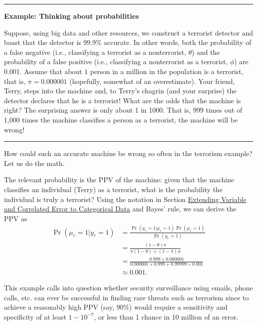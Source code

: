 \documentclass[]{krantz}
\begin{document}
\begin{center}\rule{0.5\linewidth}{\linethickness}\end{center}

\textbf{Example: Thinking about probabilities}

Suppose, using big data and other resources, we construct a terrorist
detector and boast that the detector is 99.9\% accurate. In other words,
both the probability of a false negative (i.e., classifying a terrorist
as a nonterrorist, \(\theta\)) and the probability of a false positive
(i.e., classifying a nonterrorist as a terrorist, \(\phi\)) are 0.001.
Assume that about \(1\) person in a million in the population is a
terrorist, that is, \(\pi = 0.000001\) (hopefully, somewhat of an
overestimate). Your friend, Terry, steps into the machine and, to
Terry's chagrin (and your surprise) the detector declares that he is a
terrorist! What are the odds that the machine is right? The surprising
answer is only about 1 in 1000. That is, 999 times out of 1,000 times
the machine classifies a person as a terrorist, the machine will be
wrong!

\begin{center}\rule{0.5\linewidth}{\linethickness}\end{center}

How could such an accurate machine be wrong so often in the terrorism
example? Let us do the math.

The relevant probability is the PPV of the machine: given that the
machine classifies an individual (Terry) as a terrorist, what is the
probability the individual is truly a terrorist? Using the notation in
Section \protect\hyperlink{sec:10-4.2.2}{Extending Variable and
Correlated Error to Categorical Data} and Bayes' rule, we can derive the
PPV as \[\begin{aligned}
\Pr (\mu_r = 1\vert y_r = 1) &=  \frac{\Pr (y_r = 1\vert \mu_r =
1)\Pr(\mu_r = 1)}{\Pr (y_r = 1)} \\
&= \frac{(1 - \theta )\pi }{\pi (1 - \theta ) + (1 - \pi )\phi } \\
&=  \frac{0.999\times 0.000001}{0.000001\times 0.999 + 0.99999\times 0.001} \\
 &\approx  0.001.\end{aligned}\]

This example calls into question whether security surveillance using
emails, phone calls, etc. can ever be successful in finding rare threats
such as terrorism since to achieve a reasonably high PPV (say, 90\%)
would require a sensitivity and specificity of at least \(1-10^{-7}\),
or less than 1 chance in 10 million of an error.
\end{document}
